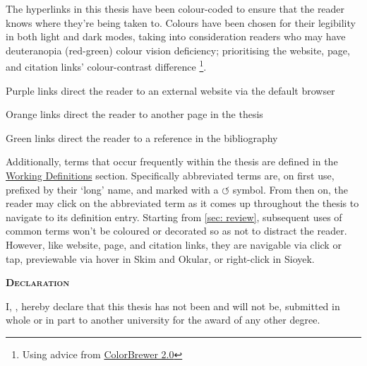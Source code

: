 \begin{SingleSpace}
\noindent The hyperlinks in this thesis have been colour-coded to ensure that the reader knows where they're being taken to. Colours have been chosen for their legibility in both light and dark modes, taking into consideration readers who may have deuteranopia (red-green) colour vision deficiency; prioritising the \textcolor{Hyurlcolor}{website}, \textcolor{Hylinkcolor}{page}, and \textcolor{Hycitecolor}{citation} links' colour-contrast difference \footnote{Using advice from \href{https://colorbrewer2.org/\#type=qualitative\&scheme=Dark2}{ColorBrewer 2.0}}.

\vspace*{0.25cm}
\noindent\textcolor{Hyurlcolor}{Purple} links direct the reader to an external website via the default browser

\noindent\textcolor{Hylinkcolor}{Orange} links direct the reader to another page in the thesis

\noindent\textcolor{Hycitecolor}{Green} links direct the reader to a reference in the bibliography

\vspace*{0.25cm}
\noindent Additionally, terms that occur frequently within the thesis are defined in the \hyperref[main]{Working Definitions} section. Specifically abbreviated terms are, on first use, prefixed by their `long' name, and marked with a \textcolor{Hylinkcolor}{$\circlearrowleft$} symbol. From then on, the reader may click on the abbreviated term as it comes up throughout the thesis to navigate to its definition entry. Starting from \autoref{sec: review}, subsequent uses of common terms won't be coloured or decorated so as not to distract the reader. However, like \textcolor{Hyurlcolor}{website}, \textcolor{Hylinkcolor}{page}, and \textcolor{Hycitecolor}{citation} links, they are navigable via click or tap, previewable via hover in Skim and Okular, or right-click in Sioyek.

\begin{flushleft}
{}
 \begin{flushleft}
	\Huge \textsc{\textbf{Declaration}}
\end{flushleft}

\begin{flushleft}
	\noindent I, \myName, hereby declare that this thesis has not been and will not be, submitted in whole or in part to another university for the award of any other degree.
\end{flushleft}


\end{flushleft}
\end{SingleSpace}
